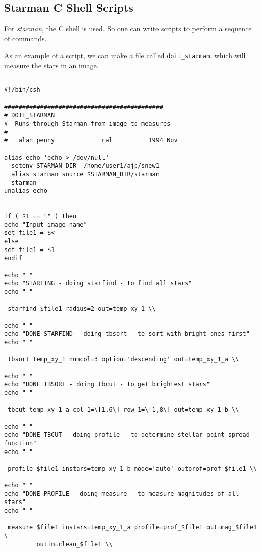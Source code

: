 \subsection{Starman C Shell Scripts}

For {\it starman}, the C shell is used. So one can write scripts to perform
a sequence of \starman commands.

As an example of a script, we can make a file called \verb|doit_starman|.
which will measure the stars in an image.

\begin{verbatim}

#!/bin/csh

############################################
# DOIT_STARMAN
#  Runs through Starman from image to measures
#
#   alan penny             ral          1994 Nov

alias echo 'echo > /dev/null'
  setenv STARMAN_DIR  /home/user1/ajp/snew1
  alias starman source $STARMAN_DIR/starman
  starman
unalias echo


if ( $1 == "" ) then
echo "Input image name"
set file1 = $<
else
set file1 = $1
endif

echo " "
echo "STARTING - doing starfind - to find all stars"
echo " "

 starfind $file1 radius=2 out=temp_xy_1 \\

echo " "
echo "DONE STARFIND - doing tbsort - to sort with bright ones first"
echo " "

 tbsort temp_xy_1 numcol=3 option='descending' out=temp_xy_1_a \\

echo " "
echo "DONE TBSORT - doing tbcut - to get brightest stars"
echo " "

 tbcut temp_xy_1_a col_1=\[1,6\] row_1=\[1,8\] out=temp_xy_1_b \\

echo " "
echo "DONE TBCUT - doing profile - to determine stellar point-spread-function"
echo " "

 profile $file1 instars=temp_xy_1_b mode='auto' outprof=prof_$file1 \\

echo " "
echo "DONE PROFILE - doing measure - to measure magnitudes of all stars"
echo " "

 measure $file1 instars=temp_xy_1_a profile=prof_$file1 out=mag_$file1 \
         outim=clean_$file1 \\


\end{verbatim}

